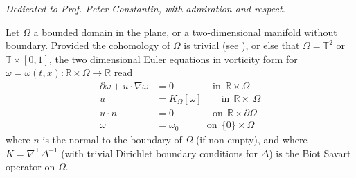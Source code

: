 \documentclass[12pt]{article}
\author{}
\begin{document}
\author{Theodore D. Drivas and Joonhyun La}
\maketitle
\vspace{-14mm}



\begin{center}
\textit{Dedicated to Prof. Peter Constantin, with admiration and respect.}
\end{center}
\vspace{-2mm}


Let $\Omega$ a bounded domain in the plane, or a two-dimensional manifold without boundary.  Provided the cohomology of $\Omega$ is trivial (see \cite{DE}), or else that $\Omega = \mathbb{T}^2$ or $\mathbb{T}\times[0,1]$, the two dimensional Euler equations in vorticity form for $\omega=\omega(t,x): \mathbb{R}\times \Omega\to \mathbb{R}$ read
\begin{align} \label{vorteqn1}
\partial \omega + u \cdot \nabla \omega &= 0 \qquad\qquad \text{in} \ \   \mathbb{R}\times \Omega\\
u &= K_\Omega[\omega] \qquad \! \text{in} \ \ \mathbb{R}\times \ \Omega\\
u\cdot n&= 0 \qquad\qquad \text{on} \ \  \mathbb{R}\times \partial \Omega\\
\omega &= \omega_0 \qquad \ \ \  \   \text{on} \ \  \{0\}\times  \Omega  \label{vorteqn4}
\end{align}
where $n$ is the normal to the boundary of $\Omega$ (if non-empty), and where  $K = \nabla^\perp \Delta^{-1}$ (with trivial Dirichlet boundary conditions for $\Delta$) is the Biot Savart operator on $\Omega$.  
\end{document}
